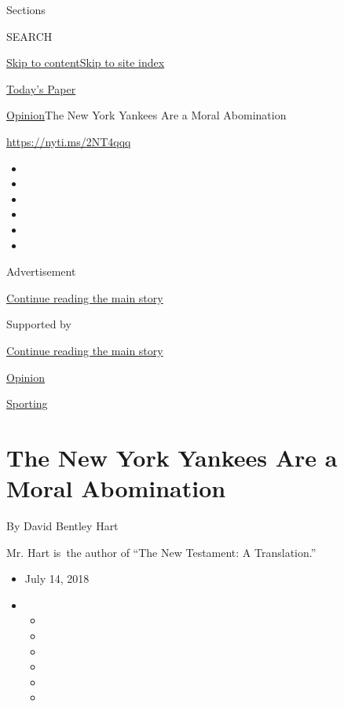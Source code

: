 Sections

SEARCH

\protect\hyperlink{site-content}{Skip to
content}\protect\hyperlink{site-index}{Skip to site index}

\href{https://myaccount.nytimes.com/auth/login?response_type=cookie\&client_id=vi}{}

\href{https://www.nytimes.com/section/todayspaper}{Today's Paper}

\href{/section/opinion}{Opinion}\textbar{}The New York Yankees Are a
Moral Abomination

\href{https://nyti.ms/2NT4qqq}{https://nyti.ms/2NT4qqq}

\begin{itemize}
\item
\item
\item
\item
\item
\item
\end{itemize}

Advertisement

\protect\hyperlink{after-top}{Continue reading the main story}

Supported by

\protect\hyperlink{after-sponsor}{Continue reading the main story}

\href{/section/opinion}{Opinion}

\href{/column/sporting}{Sporting}

\hypertarget{the-new-york-yankees-are-a-moral-abomination}{%
\section{The New York Yankees Are a Moral
Abomination}\label{the-new-york-yankees-are-a-moral-abomination}}

By David Bentley Hart

Mr. Hart is~the author of ``The New Testament: A Translation.''

\begin{itemize}
\item
  July 14, 2018
\item
  \begin{itemize}
  \item
  \item
  \item
  \item
  \item
  \item
  \end{itemize}
\end{itemize}

